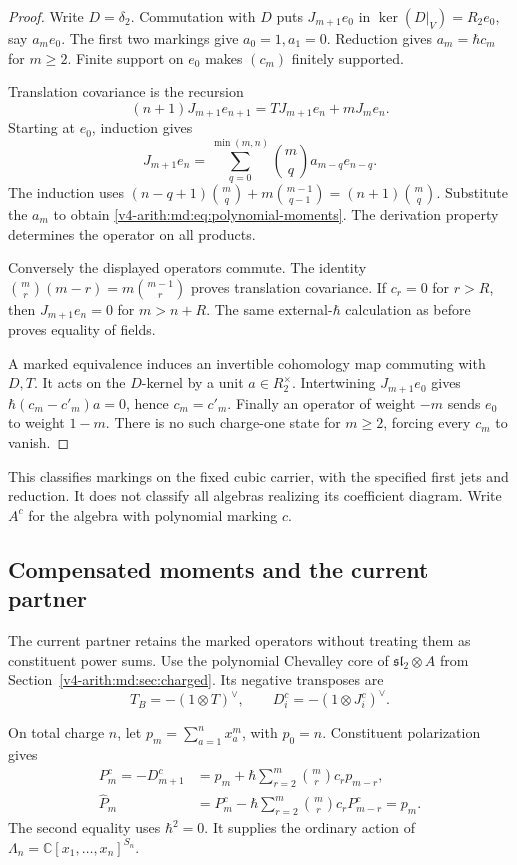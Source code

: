 \begin{proof}
Write $D=\delta_2$. Commutation with $D$
puts $J_{m+1}e_0$ in
$\ker(D|_V)=R_2e_0$, say $a_me_0$.
The first two markings give $a_0=1,a_1=0$.
Reduction gives $a_m=\hbar c_m$ for $m\geq2$.
Finite support on $e_0$ makes $(c_m)$
finitely supported.

Translation covariance is the recursion
\[
 (n+1)J_{m+1}e_{n+1}
   =TJ_{m+1}e_n+mJ_me_n.
\]
Starting at $e_0$, induction gives
\[
 J_{m+1}e_n
  =\sum_{q=0}^{\min(m,n)}
       \binom mq a_{m-q}e_{n-q}.
\]
The induction uses
$(n-q+1)\binom mq+m\binom{m-1}{q-1}
=(n+1)\binom mq$.
Substitute the $a_m$ to obtain
\eqref{v4-arith:md:eq:polynomial-moments}.
The derivation property determines the
operator on all products.

Conversely the displayed operators commute.
The identity
$\binom mr(m-r)=m\binom{m-1}r$
proves translation covariance.
If $c_r=0$ for $r>R$, then
$J_{m+1}e_n=0$ for $m>n+R$.
The same external-$\hbar$ calculation as
before proves equality of fields.

A marked equivalence induces an invertible
cohomology map commuting with $D,T$.
It acts on the $D$-kernel by a unit
$a\in R_2^\times$. Intertwining
$J_{m+1}e_0$ gives
$\hbar(c_m-c'_m)a=0$, hence $c_m=c'_m$.
Finally an operator of weight $-m$
sends $e_0$ to weight $1-m$.
There is no such charge-one state for
$m\geq2$, forcing every $c_m$ to vanish.
\end{proof}

This classifies markings on the fixed
cubic carrier, with the specified first
jets and reduction. It does not classify
all algebras realizing its coefficient
diagram. Write $A^c$ for the algebra
with polynomial marking $c$.

\subsection{Compensated moments and the current partner}

The current partner retains the marked
operators without treating them as
constituent power sums. Use the polynomial
Chevalley core of
$\mathfrak{sl}_2\otimes A$ from
Section~\ref{v4-arith:md:sec:charged}.
Its negative transposes are
\[
 T_B=-(1\otimes T)^\vee,\qquad
 D_i^c=-(1\otimes J_i^c)^\vee.
\]

On total charge $n$, let
$p_m=\sum_{a=1}^n x_a^m$, with $p_0=n$.
Constituent polarization gives
\begin{equation}\label{v4-arith:md:eq:compensated-moments}
 \begin{split}
 P_m^c=-D_{m+1}^c
   &=p_m+\hbar\sum_{r=2}^m\binom mr c_rp_{m-r},\\
 \widehat P_m
   &=P_m^c-\hbar\sum_{r=2}^m\binom mr c_rP_{m-r}^c
     =p_m.
 \end{split}
\end{equation}
The second equality uses $\hbar^2=0$.
It supplies the ordinary action of
$\Lambda_n=\mathbb C[x_1,\ldots,x_n]^{S_n}$.

